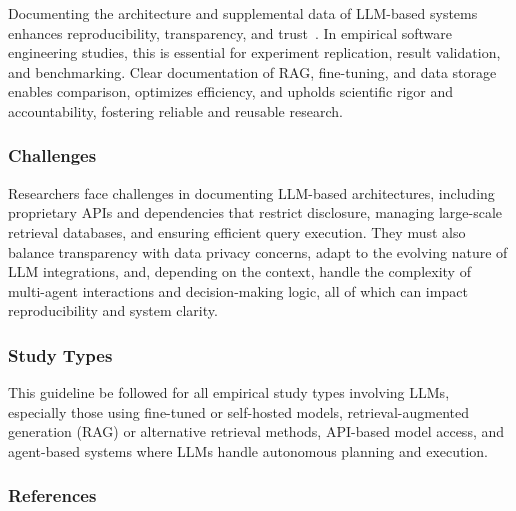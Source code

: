 Documenting the architecture and supplemental data of LLM-based systems enhances reproducibility, transparency, and trust~\cite{DBLP:journals/software/LuZXXW24}. In empirical software engineering studies, this is essential for experiment replication, result validation, and benchmarking. Clear documentation of RAG, fine-tuning, and data storage enables comparison, optimizes efficiency, and upholds scientific rigor and accountability, fostering reliable and reusable research.

\subsubsection{Challenges}

Researchers face challenges in documenting LLM-based architectures, including proprietary APIs and dependencies that restrict disclosure, managing large-scale retrieval databases, and ensuring efficient query execution. They must also balance transparency with data privacy concerns, adapt to the evolving nature of LLM integrations, and, depending on the context, handle the complexity of multi-agent interactions and decision-making logic, all of which can impact reproducibility and system clarity.

\subsubsection{Study Types}

This guideline \must be followed for all empirical study types involving LLMs, especially those using fine-tuned or self-hosted models, retrieval-augmented generation (RAG) or alternative retrieval methods, API-based model access, and agent-based systems where LLMs handle autonomous planning and execution.

\subsubsection{References}





